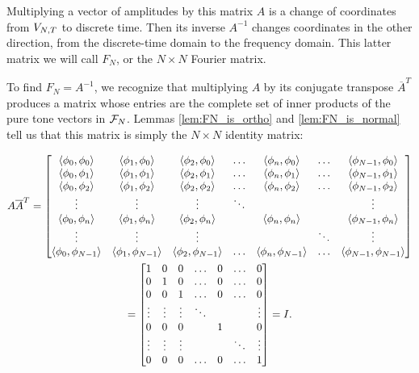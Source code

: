 \par Multiplying a vector of amplitudes by this matrix $A$ is a change of coordinates from $V_{N,T}$ to discrete time. Then its inverse $A^{-1}$ changes coordinates in the other direction, from the discrete-time domain to the frequency domain. This latter matrix we will call $F_N$, or the $N\times N$ Fourier matrix.

\par \bigskip To find $F_N = A^{-1}$, we recognize that multiplying $A$ by its conjugate transpose $\overline{A}^T$ produces a matrix whose entries are the complete set of inner products of the pure tone vectors in $\mathcal{F}_N$. Lemmas \ref{lem:FN_is_ortho} and \ref{lem:FN_is_normal} tell us that this matrix is simply the $N\times N$ identity matrix:

\begin{example}
    \begin{multline*}
        A\overline{A}^T = \begin{bmatrix}
            \langle \phi_0,\phi_0 \rangle & \langle \phi_1,\phi_0 \rangle & \langle \phi_2,\phi_0 \rangle & \hdots & \langle \phi_n,\phi_0 \rangle & \hdots & \langle \phi_{N-1},\phi_0 \rangle \\
            \langle \phi_0,\phi_1 \rangle & \langle \phi_1,\phi_1 \rangle & \langle \phi_2,\phi_1 \rangle & \hdots & \langle \phi_n,\phi_1 \rangle & \hdots & \langle \phi_{N-1},\phi_1 \rangle \\
            \langle \phi_0,\phi_2 \rangle & \langle \phi_1,\phi_2 \rangle & \langle \phi_2,\phi_2 \rangle & \hdots & \langle \phi_n,\phi_2 \rangle & \hdots & \langle \phi_{N-1},\phi_2 \rangle \\
            \vdots & \vdots & \vdots & \ddots & & & \vdots \\
            \langle \phi_0,\phi_n \rangle & \langle \phi_1,\phi_n \rangle & \langle \phi_2,\phi_n \rangle & & \langle \phi_n,\phi_n \rangle & & \langle \phi_{N-1},\phi_n \rangle \\
            \vdots & \vdots & \vdots & & & \ddots & \vdots \\
            \langle \phi_0,\phi_{N-1} \rangle & \langle \phi_1,\phi_{N-1} \rangle & \langle \phi_2,\phi_{N-1} \rangle & \hdots & \langle \phi_n,\phi_{N-1} \rangle & \hdots & \langle \phi_{N-1},\phi_{N-1} \rangle\\
        \end{bmatrix} \\= \begin{bmatrix}
            1 & 0 & 0 & \hdots & 0 & \hdots & 0 \\
            0 & 1 & 0 & \hdots & 0 & \hdots & 0 \\
            0 & 0 & 1 & \hdots & 0 & \hdots & 0 \\
            \vdots & \vdots & \vdots & \ddots & & & \vdots \\
            0 & 0 & 0 & & 1 & & 0 \\
            \vdots & \vdots & \vdots & & & \ddots & \vdots \\
            0 & 0 & 0 & \hdots & 0 & \hdots & 1\\
        \end{bmatrix} = I.
    \end{multline*}
\end{example}

